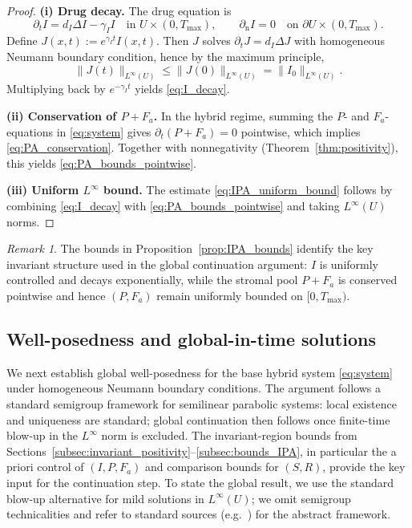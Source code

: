 \documentclass[pdflatex,sn-mathphys-ay]{sn-jnl}
\theoremstyle{thmstyleone}
\theoremstyle{definition}
\theoremstyle{remark}
\newtheorem{remark}[theorem]{Remark}
\begin{document}
\begin{proof}
\noindent\textbf{(i) Drug decay.}
The drug equation is
\[
\partial_t I = d_I\Delta I-\gamma_I I \quad \text{in }U\times(0,T_{\max}),
\qquad \partial_{\mathrm n} I=0 \quad \text{on }\partial U\times(0,T_{\max}).
\]
Define $J(x,t):=e^{\gamma_I t}I(x,t)$. Then $J$ solves $\partial_t J=d_I\Delta J$ with homogeneous Neumann boundary condition, hence by the maximum principle,
\[
\|J(t)\|_{L^\infty(U)}\le \|J(0)\|_{L^\infty(U)}=\|I_0\|_{L^\infty(U)}.
\]
Multiplying back by $e^{-\gamma_I t}$ yields \eqref{eq:I_decay}.

\smallskip
\noindent\textbf{(ii) Conservation of $P+F_a$.}
In the hybrid regime, summing the $P$- and $F_a$-equations in \eqref{eq:system} gives $\partial_t(P+F_a)=0$ pointwise, which implies \eqref{eq:PA_conservation}. 
Together with nonnegativity (Theorem~\ref{thm:positivity}), this yields \eqref{eq:PA_bounds_pointwise}.

\smallskip
\noindent\textbf{(iii) Uniform $L^\infty$ bound.}
The estimate \eqref{eq:IPA_uniform_bound} follows by combining \eqref{eq:I_decay} with \eqref{eq:PA_bounds_pointwise} and taking $L^\infty(U)$ norms.
\end{proof}

\begin{remark}
The bounds in Proposition~\ref{prop:IPA_bounds} identify the key invariant structure used in the global continuation argument: $I$ is uniformly controlled and decays exponentially, while the stromal pool $P+F_a$ is conserved pointwise and hence $(P,F_a)$ remain uniformly bounded on $[0,T_{\max})$.
\end{remark}
\subsection{Well-posedness and global-in-time solutions}
\label{subsec:global_existence}

We next establish global well-posedness for the base hybrid system \eqref{eq:system} under homogeneous Neumann boundary conditions. 
The argument follows a standard semigroup framework for semilinear parabolic systems: local existence and uniqueness are standard; global continuation then follows once finite-time blow-up in the $L^\infty$ norm is excluded. 
The invariant-region bounds from Sections~\ref{subsec:invariant_positivity}--\ref{subsec:bounds_IPA}, in particular the a priori control of $(I,P,F_a)$ and comparison bounds for $(S,R)$, provide the key input for the continuation step.
To state the global result, we use the standard blow-up alternative for mild solutions in $L^\infty(U)$; we omit semigroup technicalities and refer to standard sources (e.g.\ \citep{amann1995linear,evans2022partial}) for the abstract framework.
\end{document}
